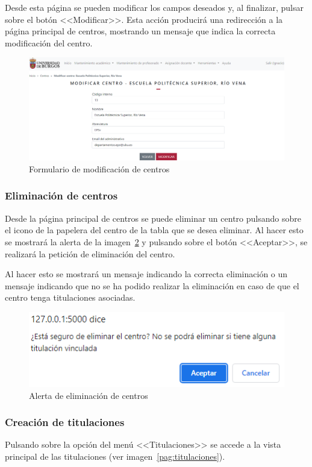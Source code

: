 Desde esta página se pueden modificar los campos deseados y, al finalizar, pulsar sobre el botón <<Modificar>>.
Esta acción producirá una redirección a la página principal de centros, mostrando un mensaje que indica la correcta modificación del centro.

\begin{figure}
	\centering
	\includegraphics[width=\textwidth]{../img/Anexos/Manual usuario/formModCentro.png}
	\caption{Formulario de modificación de centros}\label{pag:formModCentro}
\end{figure}

\subsubsection{Eliminación de centros}
Desde la página principal de centros se puede eliminar un centro pulsando sobre el icono de la papelera del centro de la tabla que se desea eliminar.
Al hacer esto se mostrará la alerta de la imagen~\ref{pag:alertElCentro} y pulsando sobre el botón <<Aceptar>>, se realizará la petición de eliminación del centro.

Al hacer esto se mostrará un mensaje indicando la correcta eliminación o un mensaje indicando que no se ha podido realizar la eliminación en caso de que el centro tenga titulaciones asociadas.

\begin{figure}
	\centering
	\includegraphics[width=.65\textwidth]{../img/Anexos/Manual usuario/alertElCentro.png}
	\caption{Alerta de eliminación de centros}\label{pag:alertElCentro}
\end{figure}

\subsubsection{Creación de titulaciones}
Pulsando sobre la opción del menú <<Titulaciones>> se accede a la vista principal de las titulaciones (ver imagen~\ref{pag:titulaciones}).

